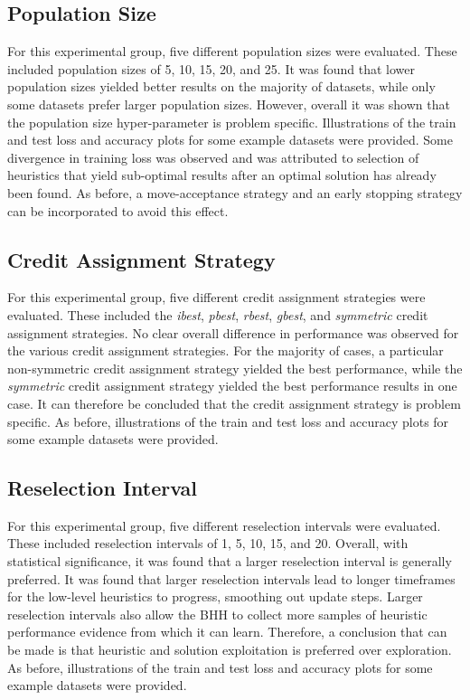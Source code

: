 \subsection{Population Size}
\label{sec:conclusion:results:summary:population_size}

For this experimental group, five different population sizes were evaluated. These included population sizes of 5, 10, 15, 20, and 25. It was found that lower population sizes yielded better results on the majority of datasets, while only some datasets prefer larger population sizes. However, overall it was shown that the population size hyper-parameter is problem specific. Illustrations of the train and test loss and accuracy plots for some example datasets were provided. Some divergence in training loss was observed and was attributed to selection of heuristics that yield sub-optimal results after an optimal solution has already been found. As before, a move-acceptance strategy and an early stopping strategy can be incorporated to avoid this effect.

\subsection{Credit Assignment Strategy}
\label{sec:conclusion:results:summary:credit}

For this experimental group, five different credit assignment strategies were evaluated. These included the \textit{ibest}, \textit{pbest}, \textit{rbest}, \textit{gbest}, and \textit{symmetric} credit assignment strategies. No clear overall difference in performance was observed for the various credit assignment strategies. For the majority of cases, a particular non-symmetric credit assignment strategy yielded the best performance, while the \textit{symmetric} credit assignment strategy yielded the best performance results in one case. It can therefore be concluded that the credit assignment strategy is problem specific. As before, illustrations of the train and test loss and accuracy plots for some example datasets were provided.

\subsection{Reselection Interval}
\label{sec:conclusion:results:summary:reselection}

For this experimental group, five different reselection intervals were evaluated. These included reselection intervals of 1, 5, 10, 15, and 20. Overall, with statistical significance, it was found that a larger reselection interval is generally preferred. It was found that larger reselection intervals lead to longer timeframes for the low-level heuristics to progress, smoothing out update steps. Larger reselection intervals also allow the \acs{BHH} to collect more samples of heuristic performance evidence from which it can learn. Therefore, a conclusion that can be made is that heuristic and solution exploitation is preferred over exploration. As before, illustrations of the train and test loss and accuracy plots for some example datasets were provided.

